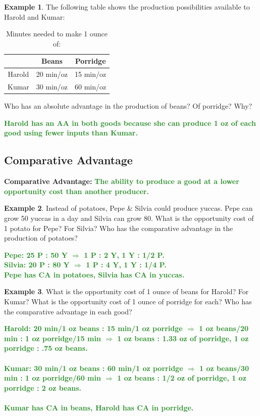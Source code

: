 \documentclass[11pt]{article}\usepackage[]{graphicx}\usepackage[]{color}
\theoremstyle{definition}
\newtheorem{exmp}{Example}[section]
\newcommand{\blank}[1]{}
\newcommand{\ddp}[1]{{\textbf{\textcolor{ForestGreen}{#1}}}}
\newcommand{\defn}[1]{\textbf{#1}}
\begin{document}
	\begin{exmp} 
		The following table shows the production possibilities available to Harold and Kumar:
	
	\begin{table}[H]
		\caption*{Minutes needed to make 1 ounce of:}
		\centering
		\begin{tabular}{c|c|c|}
			
			& Beans & Porridge \\
			\hline
			Harold & 20 min/oz & 15 min/oz \\
			
			Kumar  & 30 min/oz & 60 min/oz \\
			
		\end{tabular}
	\end{table}
	
	Who has an absolute advantage in the production of beans? Of porridge? Why?
	\end{exmp}
	\ddp{Harold has an AA in both goods because she can produce 1 oz of each good using fewer inputs than Kumar.}
	\blank{}
	
	\subsection{Comparative Advantage}
	
	\defn{Comparative Advantage:} \ddp{The ability to produce a good at a lower opportunity cost than another producer.}
	
	\begin{exmp}
		Instead of potatoes, Pepe \& Silvia could produce yuccas. Pepe can grow 50 yuccas in a day and Silvia can grow 80. What is the opportunity cost of 1 potato for Pepe? For Silvia? Who has the comparative advantage in the production of potatoes?
		\blank{} \blank{}
	\end{exmp} 
	\ddp{Pepe: 25 P : 50 Y $\Rightarrow$ 1 P : 2 Y, 1 Y : 1/2 P.\\
		Silvia: 20 P : 80 Y $\Rightarrow$ 1 P : 4 Y, 1 Y : 1/4 P. \\
		Pepe has CA in potatoes, Silvia has CA in yuccas.}
	
	\begin{exmp}
		What is the opportunity cost of 1 ounce of beans for Harold? For Kumar? What is the opportunity cost of 1 ounce of porridge for each? Who has the comparative advantage in each good?
		\blank{} \blank{}
	\end{exmp} 
	\ddp{Harold: 20 min/1 oz beans : 15 min/1 oz porridge $\Rightarrow$ 1 oz beans/20 min : 1 oz porridge/15 min $\Rightarrow$ 1 oz beans : 1.33 oz of porridge, 1 oz porridge : .75 oz beans. \\ \\
		Kumar: 30 min/1 oz beans : 60 min/1 oz porridge $\Rightarrow$ 1 oz beans/30 min : 1 oz porridge/60 min $\Rightarrow$ 1 oz beans : 1/2 oz of porridge, 1 oz porridge : 2 oz beans. \\ \\
		Kumar has CA in beans, Harold has CA in porridge. \\}
\end{document}

